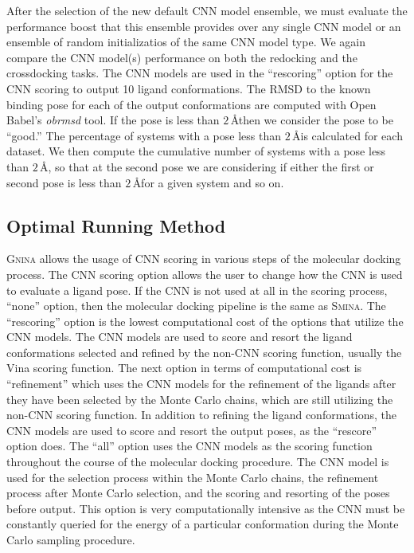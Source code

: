 \documentclass[journal=jcisd8,manuscript=article]{achemso}
\begin{document}
After the selection of the new default CNN model ensemble, we must evaluate the performance boost that this ensemble provides over any single CNN model or an ensemble of random initializatios of the same CNN model type. We again compare the CNN model(s) performance on both the redocking and the crossdocking tasks. The CNN models are used in the ``rescoring'' option for the CNN scoring to output 10 ligand conformations. The RMSD to the known binding pose for each of the output conformations are computed with Open Babel's \textit{obrmsd} tool. If the pose is less than $2\,$\AA then we consider the pose to be ``good.'' The percentage of systems with a pose less than $2\,$\AA is calculated for each dataset. We then compute the cumulative number of systems with a pose less than $2\,$\AA, so that at the second pose we are considering if either the first or second pose is less than $2\,$\AA for a given system and so on.

\subsection{Optimal Running Method}
\textsc{Gnina} allows the usage of CNN scoring in various steps of the molecular docking process. The CNN scoring option allows the user to change how the CNN is used to evaluate a ligand pose. If the CNN is not used at all in the scoring process, ``none'' option, then the molecular docking pipeline is the same as \textsc{Smina}. The ``rescoring'' option is the lowest computational cost of the options that utilize the CNN models. The CNN models are used to score and resort the ligand conformations selected and refined by the non-CNN scoring function, usually the Vina scoring function. The next option in terms of computational cost is ``refinement'' which uses the CNN models for the refinement of the ligands after they have been selected by the Monte Carlo chains, which are still utilizing the non-CNN scoring function. In addition to refining the ligand conformations, the CNN models are used to score and resort the output poses, as the ``rescore'' option does. The ``all'' option uses the CNN models as the scoring function throughout the course of the molecular docking procedure. The CNN model is used for the selection process within the Monte Carlo chains, the refinement process after Monte Carlo selection, and the scoring and resorting of the poses before output. This option is very computationally intensive as the CNN must be constantly queried for the energy of a particular conformation during the Monte Carlo sampling procedure.
\end{document}
